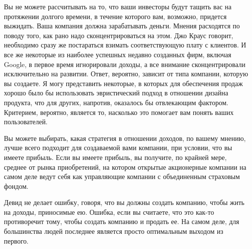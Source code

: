 \documentclass[ebook,12pt,oneside,openany]{memoir}
\begin{document}
Вы не можете рассчитывать на то, что ваши инвесторы будут тащить вас
на протяжении долгого времени, в течение которого вам, возможно,
придется выжидать. Ваша компания должна зарабатывать деньги. Мнения
расходятся по поводу того, как рано надо сконцентрироваться на этом.
Джо Краус говорит, необходимо сразу же постараться взимать
соответствующую плату с клиентов. И все же некоторые из наиболее
успешных недавно созданных фирм, включая Google, в первое время
игнорировали доходы, а все внимание сконцентрировали исключительно на
развитии. Ответ, вероятно, зависит от типа компании, которую вы
создаете. Я могу представить некоторые, в которых для обеспечения
продаж хорошо было бы использовать эвристический подход в отношении
дизайна продукта, что для других, напротив, оказалось бы отвлекающим
фактором. Критерием, вероятно, является то, насколько это помогает вам
понять ваших пользователей.

Вы можете выбирать, какая стратегия в отношении доходов, по вашему
мнению, лучше всего подходит для создаваемой вами компании, при
условии, что вы имеете прибыль. Если вы имеете прибыль, вы получите,
по крайней мере, среднее от рынка приобретений, на котором открытые
акционерные компании на самом деле ведут себя как управляющие компании
с объединенным страховым фондом.

Девид не делает ошибку, говоря, что вы должны создать компанию, чтобы
жить на доходы, приносимые ею. Ошибка, если вы считаете, что это
как-то противоречит тому, чтобы создать компанию и продать ее. На
самом деле, для большинства людей последнее является просто
оптимальным выходом из первого.
\end{document}
